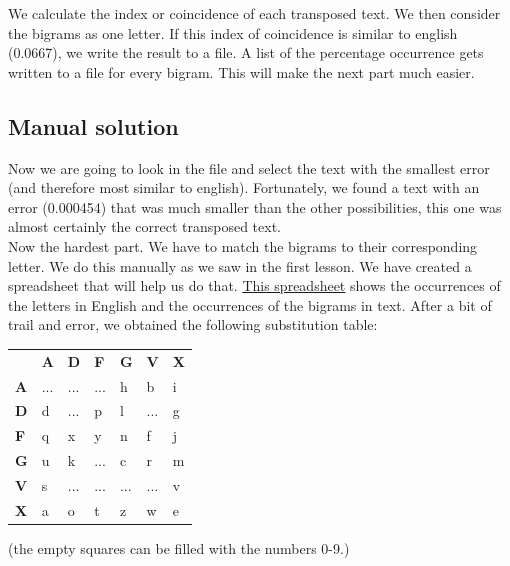 \documentclass{article}
\begin{document}
We calculate the index or coincidence of each transposed text. We then consider the bigrams as one letter. If this index of coincidence is similar to english (0.0667), we write the result to a file. A list of the percentage occurrence gets written to a file for every bigram. This will make the next part much easier.
\subsection{Manual solution}
Now we are going to look in the file and select the text with the smallest error (and therefore most similar to english). Fortunately, we found a text with an error (0.000454) that was much smaller than the other possibilities, this one was almost certainly the correct transposed text.\\

Now the hardest part. We have to match the bigrams to their corresponding letter. We do this manually as we saw in the first lesson. We have created a spreadsheet that will help us do that. \hyperlink{https://docs.google.com/spreadsheets/d/18L9Xed-bFH-7W2jY9kgeEXixlJdJMib6p8IxcVjUxeQ/edit?usp=sharing}{This spreadsheet} shows the occurrences of the letters in English and the occurrences of the bigrams in text. After a bit of trail and error, we obtained the following substitution table:
\begin{table}[H]
\begin{tabular}{lllllll}
\textbf{} &
  \textbf{A} &
  \textbf{D} &
  \textbf{F} &
  \textbf{G} &
  \textbf{V} &
  \textbf{X} \\ \cline{2-7}
\multicolumn{1}{l|}{\textbf{A}} &
  \multicolumn{1}{l|}{...} &
  \multicolumn{1}{l|}{...} &
  \multicolumn{1}{l|}{...} &
  \multicolumn{1}{l|}{h} &
  \multicolumn{1}{l|}{b} &
  \multicolumn{1}{l|}{i} \\ \cline{2-7}
\multicolumn{1}{l|}{\textbf{D}} &
  \multicolumn{1}{l|}{d} &
  \multicolumn{1}{l|}{...} &
  \multicolumn{1}{l|}{p} &
  \multicolumn{1}{l|}{l} &
  \multicolumn{1}{l|}{...} &
  \multicolumn{1}{l|}{g} \\ \cline{2-7}
\multicolumn{1}{l|}{\textbf{F}} &
  \multicolumn{1}{l|}{q} &
  \multicolumn{1}{l|}{x} &
  \multicolumn{1}{l|}{y} &
  \multicolumn{1}{l|}{n} &
  \multicolumn{1}{l|}{f} &
  \multicolumn{1}{l|}{j} \\ \cline{2-7}
\multicolumn{1}{l|}{\textbf{G}} &
  \multicolumn{1}{l|}{u} &
  \multicolumn{1}{l|}{k} &
  \multicolumn{1}{l|}{...} &
  \multicolumn{1}{l|}{c} &
  \multicolumn{1}{l|}{r} &
  \multicolumn{1}{l|}{m} \\ \cline{2-7}
\multicolumn{1}{l|}{\textbf{V}} &
  \multicolumn{1}{l|}{s} &
  \multicolumn{1}{l|}{...} &
  \multicolumn{1}{l|}{...} &
  \multicolumn{1}{l|}{...} &
  \multicolumn{1}{l|}{...} &
  \multicolumn{1}{l|}{v} \\ \cline{2-7}
\multicolumn{1}{l|}{\textbf{X}} &
  \multicolumn{1}{l|}{a} &
  \multicolumn{1}{l|}{o} &
  \multicolumn{1}{l|}{t} &
  \multicolumn{1}{l|}{z} &
  \multicolumn{1}{l|}{w} &
  \multicolumn{1}{l|}{e} \\ \cline{2-7}
\end{tabular}
\end{table}
(the empty squares can be filled with the numbers 0-9.)
\end{document}
